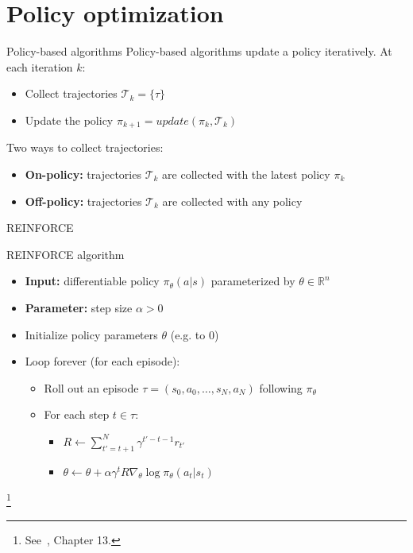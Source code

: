 \documentclass[10pt, aspectratio=1610]{beamer}
\newcommand\blfootnote[1]{%
  \begingroup
  \renewcommand\thefootnote{}%
  \footnote{#1}%
  \addtocounter{footnote}{-1}%
  \endgroup
}
\begin{document}
\section{Policy optimization}

\begin{frame}{Policy-based algorithms}
    Policy-based algorithms update a policy iteratively. At each iteration $k$:
    \begin{itemize}
        \item Collect trajectories $\mathcal{T}_k = \{ \tau \}$
        \item Update the policy $\pi_{k+1} = \mathit{update}(\pi_k, \mathcal{T}_k)$
    \end{itemize}
    Two ways to collect trajectories:
    \begin{itemize}
        \item \textbf{On-policy:} trajectories $\mathcal{T}_k$ are collected with the latest policy $\pi_k$
        \item \textbf{Off-policy:} trajectories $\mathcal{T}_k$ are collected with any policy
    \end{itemize}
\end{frame}

\begin{frame}{REINFORCE}
    \begin{block}{REINFORCE algorithm}
        \begin{itemize}
            \item \textbf{Input:} differentiable policy $\pi_\theta(a | s)$ parameterized by $\theta \in \mathbb{R}^n$
            \item \textbf{Parameter:} step size $\alpha > 0$
            \item Initialize policy parameters $\theta$ (e.g. to $0$)
            \item Loop forever (for each episode):
                \begin{itemize}
                    \item Roll out an episode $\tau = (s_0, a_0, \ldots, s_{N}, a_{N})$ following $\pi_\theta$
                    \item For each step $t \in \tau$:
                        \begin{itemize}
                            \item $R \leftarrow \sum_{t' = t + 1}^N \gamma^{t' - t - 1} r_{t'}$
                            \item $\theta \leftarrow \theta + \alpha \gamma^t R \nabla_\theta \log \pi_\theta(a_t | s_t)$
                        \end{itemize}
                \end{itemize}
        \end{itemize}
    \end{block}
    \blfootnote{
        See~\cite{sutton2018}, Chapter 13.
    }
\end{frame}
\end{document}
